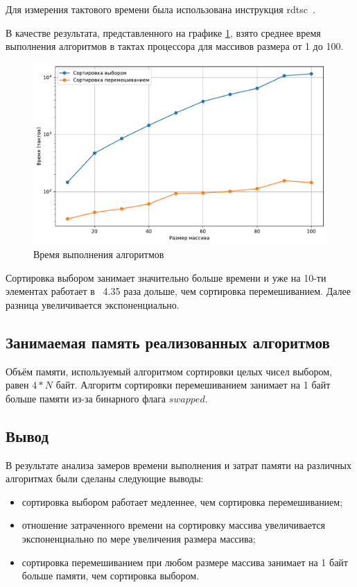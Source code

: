 Для измерения тактового времени была использована инструкция rdtsc~\cite{microsoft_rdtsc}.

В качестве результата, представленного на графике \ref{fig:time}, взято среднее время выполнения алгоритмов в тактах процессора для массивов размера от 1 до 100.

\begin{figure}
	\centering
	\includegraphics[width=0.9\linewidth]{../src/lab_03/time_logscale}
	\caption{Время выполнения алгоритмов}
	\label{fig:time}
\end{figure}

Сортировка выбором занимает значительно больше времени и уже на 10-ти элементах работает в ~4.35 раза дольше, чем сортировка перемешиванием.
Далее разница увеличивается экспоненциально.

\newpage

\subsection{Занимаемая память реализованных алгоритмов}
 Объём памяти, используемый алгоритмом сортировки целых чисел выбором, равен $4 * N$ байт.
 Алгоритм сортировки перемешиванием занимает на 1 байт больше памяти из-за бинарного флага $swapped$.

\subsection{Вывод}

В результате анализа замеров времени выполнения и затрат памяти на различных алгоритмах были сделаны следующие выводы:

\begin{itemize}
	\item сортировка выбором работает медленнее, чем сортировка перемешиванием;
	\item отношение затраченного времени на сортировку массива увеличивается экспоненциально по мере увеличения размера массива;
	\item сортировка перемешиванием при любом размере массива занимает на 1 байт больше памяти, чем сортировка выбором.
\end{itemize}